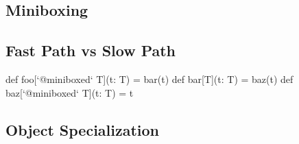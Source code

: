 \subsection{Miniboxing}



\subsection{Fast Path vs Slow Path}


\begin{lstlisting-nobreak}
 def foo[`@miniboxed` T](t: T) = bar(t)
 def bar[T](t: T) = baz(t)
 def baz[`@miniboxed` T](t: T) = t
\end{lstlisting-nobreak}



\subsection{Object Specialization}





